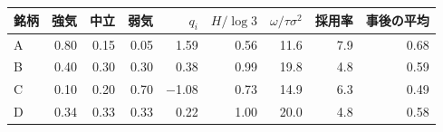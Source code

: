 \begin{tabular}{lrrrrrrrr}
\toprule
銘柄 & 強気 & 中立 & 弱気 & $q_i$ & $H/\log 3$ & $\omega/\tau\sigma^2$ & 採用率 & 事後の平均 \\
\midrule
A & 0.80 & 0.15 & 0.05 & 1.59 & 0.56 & 11.6 & 7.9 & 0.68 \\
B & 0.40 & 0.30 & 0.30 & 0.38 & 0.99 & 19.8 & 4.8 & 0.59 \\
C & 0.10 & 0.20 & 0.70 & \ensuremath{-}1.08 & 0.73 & 14.9 & 6.3 & 0.49 \\
D & 0.34 & 0.33 & 0.33 & 0.22 & 1.00 & 20.0 & 4.8 & 0.58 \\
\bottomrule
\end{tabular}
